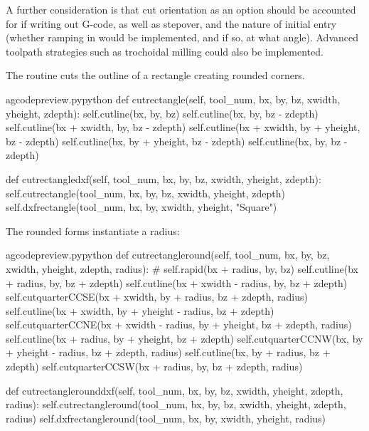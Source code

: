 \documentclass{ltxdoc}
\begin{document}
A further consideration is that cut orientation as an option should be accounted for if writing out G-code, as well as stepover, and the nature of initial entry (whether ramping in would be implemented, and if so, at what angle). Advanced toolpath strategies such as trochoidal milling could also be implemented.

The routine  cuts the outline of a rectangle creating rounded corners.

\lstset{firstnumber=\thegcpy}
\begin{writecode}{a}{gcodepreview.py}{python}
    def cutrectangle(self, tool_num, bx, by, bz, xwidth, yheight, zdepth):
        self.cutline(bx, by, bz)
        self.cutline(bx, by, bz - zdepth)
        self.cutline(bx + xwidth, by, bz - zdepth)
        self.cutline(bx + xwidth, by + yheight, bz - zdepth)
        self.cutline(bx, by + yheight, bz - zdepth)
        self.cutline(bx, by, bz - zdepth)

    def cutrectangledxf(self, tool_num, bx, by, bz, xwidth, yheight, zdepth):
        self.cutrectangle(tool_num, bx, by, bz, xwidth, yheight, zdepth)
        self.dxfrectangle(tool_num, bx, by, xwidth, yheight, "Square")

\end{writecode}
\addtocounter{gcpy}{12}

The rounded forms instantiate a radius:

\lstset{firstnumber=\thegcpy}
\begin{writecode}{a}{gcodepreview.py}{python}
    def cutrectangleround(self, tool_num, bx, by, bz, xwidth, yheight, zdepth, radius):
#        self.rapid(bx + radius, by, bz)
        self.cutline(bx + radius, by, bz + zdepth)
        self.cutline(bx + xwidth - radius, by, bz + zdepth)
        self.cutquarterCCSE(bx + xwidth, by + radius, bz + zdepth, radius) 
        self.cutline(bx + xwidth, by + yheight - radius, bz + zdepth)
        self.cutquarterCCNE(bx + xwidth - radius, by + yheight, bz + zdepth, radius) 
        self.cutline(bx + radius, by + yheight, bz + zdepth)
        self.cutquarterCCNW(bx, by + yheight - radius, bz + zdepth, radius) 
        self.cutline(bx, by + radius, bz + zdepth)
        self.cutquarterCCSW(bx + radius, by, bz + zdepth, radius) 

    def cutrectanglerounddxf(self, tool_num, bx, by, bz, xwidth, yheight, zdepth, radius):
        self.cutrectangleround(tool_num, bx, by, bz, xwidth, yheight, zdepth, radius)
        self.dxfrectangleround(tool_num, bx, by, xwidth, yheight, radius)

\end{writecode}
\addtocounter{gcpy}{16}
\end{document}
